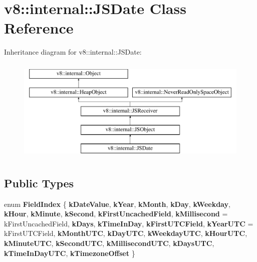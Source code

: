 \hypertarget{classv8_1_1internal_1_1JSDate}{}\section{v8\+:\+:internal\+:\+:J\+S\+Date Class Reference}
\label{classv8_1_1internal_1_1JSDate}
Inheritance diagram for v8\+:\+:internal\+:\+:J\+S\+Date\+:\begin{figure}[H]
\begin{center}
\leavevmode
\includegraphics[height=5.000000cm]{classv8_1_1internal_1_1JSDate}
\end{center}
\end{figure}
\subsection*{Public Types}
\begin{DoxyCompactItemize}
\item 
\mbox{\label{classv8_1_1internal_1_1JSDate_afc7907b14eb9ef9499498c3b1e19e379}} 
enum {\bfseries Field\+Index} \{ \newline
{\bfseries k\+Date\+Value}, 
{\bfseries k\+Year}, 
{\bfseries k\+Month}, 
{\bfseries k\+Day}, 
\newline
{\bfseries k\+Weekday}, 
{\bfseries k\+Hour}, 
{\bfseries k\+Minute}, 
{\bfseries k\+Second}, 
\newline
{\bfseries k\+First\+Uncached\+Field}, 
{\bfseries k\+Millisecond} = k\+First\+Uncached\+Field, 
{\bfseries k\+Days}, 
{\bfseries k\+Time\+In\+Day}, 
\newline
{\bfseries k\+First\+U\+T\+C\+Field}, 
{\bfseries k\+Year\+U\+TC} = k\+First\+U\+T\+C\+Field, 
{\bfseries k\+Month\+U\+TC}, 
{\bfseries k\+Day\+U\+TC}, 
\newline
{\bfseries k\+Weekday\+U\+TC}, 
{\bfseries k\+Hour\+U\+TC}, 
{\bfseries k\+Minute\+U\+TC}, 
{\bfseries k\+Second\+U\+TC}, 
\newline
{\bfseries k\+Millisecond\+U\+TC}, 
{\bfseries k\+Days\+U\+TC}, 
{\bfseries k\+Time\+In\+Day\+U\+TC}, 
{\bfseries k\+Timezone\+Offset}
 \}
\end{DoxyCompactItemize}
